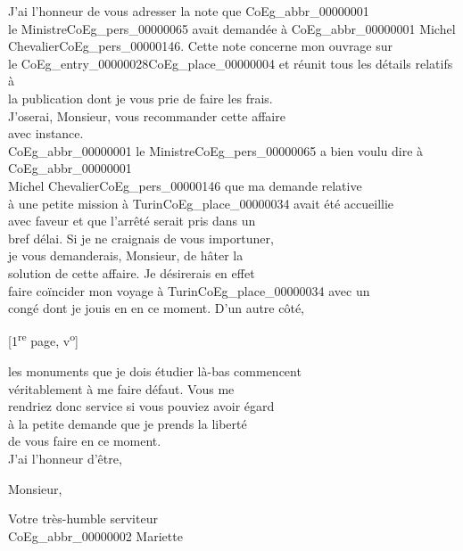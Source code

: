 \documentclass{book}
\begin{document}
\indent J’ai l’honneur de vous adresser la note que \gls{CoEg_abbr_00000001}\\
le Ministre\gls{CoEg_pers_00000065} avait demandée à \gls{CoEg_abbr_00000001} Michel\\
Chevalier\gls{CoEg_pers_00000146}. Cette note concerne mon ouvrage sur\\
le \Gls{CoEg_entry_00000028}\gls{CoEg_place_00000004} et réunit tous les détails relatifs à\\
la publication dont je vous prie de faire les frais.\\
J’oserai, Monsieur, vous recommander cette affaire\\
avec instance.\\
\indent \gls{CoEg_abbr_00000001} le Ministre\gls{CoEg_pers_00000065} a bien voulu dire à \gls{CoEg_abbr_00000001}\\
Michel Chevalier\gls{CoEg_pers_00000146} que ma demande relative\\
à une petite mission à Turin\gls{CoEg_place_00000034} avait été accueillie\\
avec faveur et que l’arrêté serait pris dans un\\
bref délai. Si je ne craignais de vous importuner,\\
je vous demanderais, Monsieur, de hâter la\\
solution de cette affaire. Je désirerais en effet\\
faire coïncider mon voyage à Turin\gls{CoEg_place_00000034} avec un\\
congé dont je jouis en en ce moment. D’un autre côté,
{\footnotesize\begin{center} {[1\textsuperscript{re} page, v\textsuperscript{o}]}\end{center}}
\noindent les monuments que je dois étudier là-bas commencent\\
véritablement à me faire défaut. Vous me\\
rendriez donc service si vous pouviez avoir égard\\
à la petite demande que je prends la liberté\\
de vous faire en ce moment.\\
\indent J’ai l’honneur d’être,
\begin{center}Monsieur,\end{center}
\begin{center}\hspace{5cm}Votre très-humble serviteur\\
\hspace{5cm}\gls{CoEg_abbr_00000002} Mariette\end{center}
\end{document}
